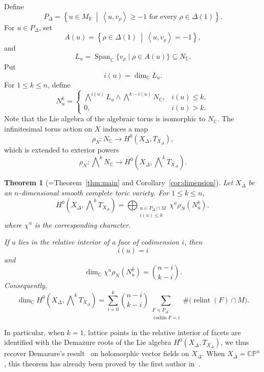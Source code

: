 \documentclass[colorlinks,11pt,reqno]{amsart}
\newtheorem{Thm}{Theorem}
\theoremstyle{definition}
\theoremstyle{remark}
\numberwithin{equation}{section}
\numberwithin{equation}{section}
\newcommand{\Pair}[2]{\left\langle #1,#2\right\rangle}
\newcommand{\C}{\mathbb{C}}
\newcommand{\CP}{\mathbb{CP}}
\newcommand{\R}{\mathbb{R}}
\DeclareMathOperator{\Span}{Span}
\DeclareMathOperator{\relint}{relint}
\DeclareMathOperator{\codim}{codim}
\begin{document}
Define
\[
P_\Delta =
\left\{
u\in M_{\R}\ \middle|\
\Pair{u}{v_\rho}\geq-1
\text{ for every }\rho\in\Delta(1)
\right\}.
\]
For \(u\in P_\Delta\), set
\[
A(u) =
\left\{
\rho\in\Delta(1)
\ \middle|\
\Pair{u}{v_\rho}=-1
\right\},
\]
and
\[
L_u =
\Span_{\C}
\{v_\rho\mid\rho\in A(u)\}
\subseteq N_{\C}.
\]
Put
\[
i(u)=\dim_{\C}L_u.
\]
For \(1\leq k\leq n\), define
\[
N_u^k
=
\begin{cases}
\displaystyle
\bigwedge\nolimits^{i(u)}L_u
\wedge
\bigwedge\nolimits^{k-i(u)}N_{\C},
&i(u)\leq k,\\[6pt]
0,&i(u)>k.
\end{cases}
\]
Note that the Lie algebra of the algebraic torus is isomorphic to $N_\C$. The infinitesimal torus action on $X$ induces a map
\[
\rho_N \colon N_{\C} \longrightarrow H^0(X_\Delta,T_{X_\Delta}),
\]
which is extended to exterior powers
\[
 \rho_N \colon \bigwedge\nolimits^k N_{\C} \longrightarrow H^0(X_\Delta,\bigwedge\nolimits^k T_{X_\Delta}).
\]
\begin{Thm}[=Theorem~\ref{thm:main} and Corollary~\ref{cor:dimension}] \label{General-multiVect-thm}
Let \(X_\Delta\) be an \(n\)-dimensional smooth complete toric
variety. For \(1\leq k\leq n\),
\[
H^0\!\left( X_\Delta,\bigwedge\nolimits^kT_{X_\Delta} \right)
= \bigoplus_{\substack{u\in P_\Delta\cap M\\i(u)\leq k}} \chi^u\rho_N(N_u^k),
\]
where $\chi^u$ is the corresponding character.

If \(u\) lies in the relative interior of a face of codimension \(i\), then
\[
i(u)=i
\]
and
\[
\dim_{\C}\chi^u\rho_N(N_u^k)
=
\binom{n-i}{k-i}.
\]
Consequently,
\[
\dim_{\C} H^0\!\left(X_\Delta,\bigwedge\nolimits^kT_{X_\Delta} \right) = \sum_{i=0}^{k}
\binom{n-i}{k-i} \sum_{\substack{F\preceq P_\Delta\\\codim F=i}}
\#\bigl(\relint(F)\cap M\bigr).
\]
\end{Thm}
In particular, when $k=1$,  lattice points in the relative interior of facets are identified with the Demazure roots of the Lie algebra $H^0(X_\Delta, T_{X_{\Delta}})$,
we thus recover Demazure's result~\cite{Demazure} on holomorphic vector fields on $X_{\Delta}$.
When $X_{\Delta} = \CP^n$, this theorem has already been proved by the first author in~\cite{Hong 19}.
\end{document}
